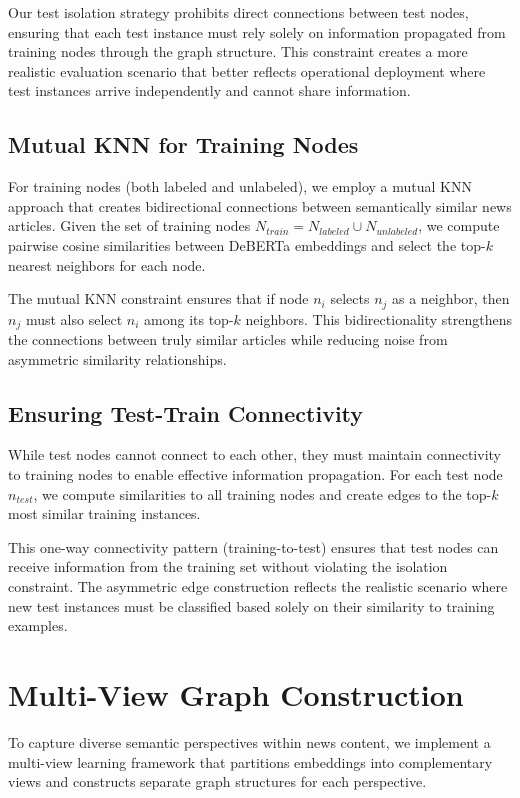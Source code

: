 Our test isolation strategy prohibits direct connections between test nodes, ensuring that each test instance must rely solely on information propagated from training nodes through the graph structure. This constraint creates a more realistic evaluation scenario that better reflects operational deployment where test instances arrive independently and cannot share information.

\subsection{Mutual KNN for Training Nodes}

For training nodes (both labeled and unlabeled), we employ a mutual KNN approach that creates bidirectional connections between semantically similar news articles. Given the set of training nodes $N_{train} = N_{labeled} \cup N_{unlabeled}$, we compute pairwise cosine similarities between DeBERTa embeddings and select the top-$k$ nearest neighbors for each node.

The mutual KNN constraint ensures that if node $n_i$ selects $n_j$ as a neighbor, then $n_j$ must also select $n_i$ among its top-$k$ neighbors. This bidirectionality strengthens the connections between truly similar articles while reducing noise from asymmetric similarity relationships.

\subsection{Ensuring Test-Train Connectivity}

While test nodes cannot connect to each other, they must maintain connectivity to training nodes to enable effective information propagation. For each test node $n_{test}$, we compute similarities to all training nodes and create edges to the top-$k$ most similar training instances.

This one-way connectivity pattern (training-to-test) ensures that test nodes can receive information from the training set without violating the isolation constraint. The asymmetric edge construction reflects the realistic scenario where new test instances must be classified based solely on their similarity to training examples.

\section{Multi-View Graph Construction}

To capture diverse semantic perspectives within news content, we implement a multi-view learning framework that partitions embeddings into complementary views and constructs separate graph structures for each perspective.


